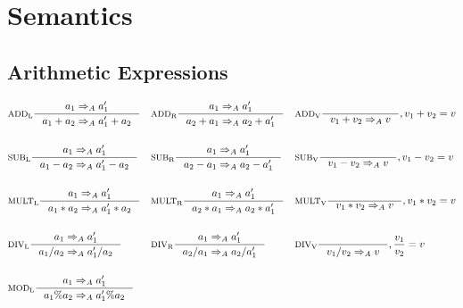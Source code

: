 \section{Semantics}
\newcommand{\Tif}{\text{if}}
\newcommand{\Telse}{\text{else}}
\newcommand{\Tand}{\mathbin{\text{AND}}}
\newcommand{\Tnot}{\mathbin{\text{NOT}}}
\newcommand{\Tnand}{\mathbin{\text{NAND}}}
\newcommand{\Tor}{\mathbin{\text{OR}}}
\newcommand{\Tnor}{\mathbin{\text{NOR}}}
\newcommand{\Txor}{\mathbin{\text{XOR}}}
\newcommand{\Tfor}{\mathbin{\text{for}}}
\subsection{Arithmetic Expressions}
\begin{align*}
&\inference[$\text{ADD}_\text{L}$]{a_1 \Rightarrow_A a_1'}
                    {a_1 + a_2 \Rightarrow_A a_1' + a_2}
&
&\inference[$\text{ADD}_\text{R}$]{a_1 \Rightarrow_A a_1'}
										{a_2 + a_1 \Rightarrow_A a_2 + a_1'}
&
&\inference[$\text{ADD}_\text{V}$]{}
                    {v_1 + v_2 \Rightarrow_A v}
										{, v_1 + v_2 = v}
\\\\
&\inference[$\text{SUB}_\text{L}$]{a_1 \Rightarrow_A a_1'}
                    {a_1 - a_2 \Rightarrow_A a_1' - a_2}
&
&\inference[$\text{SUB}_\text{R}$]{a_1 \Rightarrow_A a_1'}
                    {a_2 - a_1 \Rightarrow_A a_2 - a_1'}
&
&\inference[$\text{SUB}_\text{V}$]{}
                    {v_1 - v_2 \Rightarrow_A v}
										{, v_1 - v_2 = v}
\\\\
&\inference[$\text{MULT}_\text{L}$]{a_1 \Rightarrow_A a_1'}
                     {a_1 * a_2 \Rightarrow_A a_1' * a_2}
&
&\inference[$\text{MULT}_\text{R}$]{a_1 \Rightarrow_A a_1'}
                     {a_2 * a_1 \Rightarrow_A a_2 * a_1'}
&
&\inference[$\text{MULT}_\text{V}$]{}
                     {v_1 * v_2 \Rightarrow_A v}
										 {, v_1 * v_2 = v}
\\\\
&\inference[$\text{DIV}_\text{L}$]{a_1 \Rightarrow_A a_1'}
                    {a_1 / a_2 \Rightarrow_A a_1' / a_2}
&
&\inference[$\text{DIV}_\text{R}$]{a_1 \Rightarrow_A a_1'}
                    {a_2 / a_1 \Rightarrow_A a_2 / a_1'}
&
&\inference[$\text{DIV}_\text{V}$]{}
                    {v_1 / v_2 \Rightarrow_A v}
										{, \frac{v_1}{v_2} = v}
\\\\
&\inference[$\text{MOD}_\text{L}$]{a_1 \Rightarrow_A a_1'}
                    {a_1 \% a_2 \Rightarrow_A a_1' \% a_2}

\end{align*}
